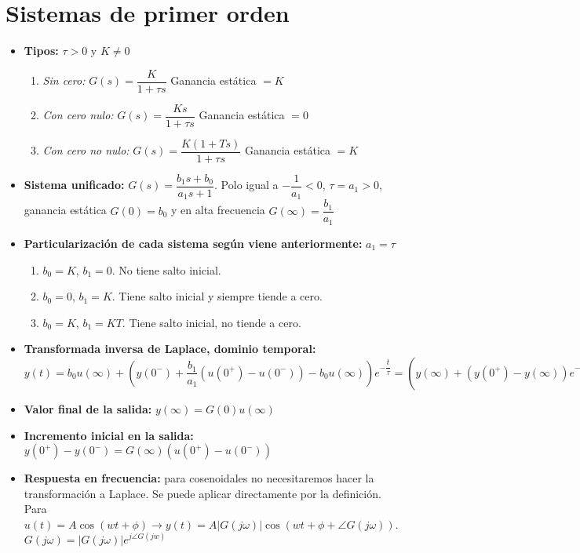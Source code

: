 \documentclass[a4paper, twocolumn, 10pt]{article}
\begin{document}
\section{Sistemas de primer orden}

\begin{itemize}
	\item \textbf{Tipos:} $\tau > 0$ y $K \neq 0$
	\begin{enumerate}
		\item \textit{Sin cero:} $G(s) = \dfrac{K}{1 + \tau s}$ Ganancia estática $= K$
		\item \textit{Con cero nulo:} $G(s) = \dfrac{Ks}{1 + \tau s}$ Ganancia estática $= 0$
		\item \textit{Con cero no nulo:} $G(s) = \dfrac{K(1 + Ts)}{1 + \tau s}$ Ganancia estática $= K$
	\end{enumerate}
	\item \textbf{Sistema unificado:} $G(s) = \dfrac{b_1s + b_0}{a_1s + 1}$. Polo igual a $-\dfrac{1}{a_1} < 0$, $\tau = a_1 > 0$, ganancia estática $G(0) = b_0$ y en alta frecuencia $G(\infty) = \dfrac{b_1}{a_1}$
	\item \textbf{Particularización de cada sistema según viene anteriormente:} $a_1 = \tau$
	\begin{enumerate}
		\item $b_0 = K$, $b_1 = 0$. No tiene salto inicial.
		\item $b_0 = 0$, $b_1 = K$. Tiene salto inicial y siempre tiende a cero.
		\item $b_0 = K$, $b_1 = KT$. Tiene salto inicial, no tiende a cero.
	\end{enumerate}
	\item \textbf{Transformada inversa de Laplace, dominio temporal:} $y(t) = b_0u(\infty) + \left(y(0^-) + \dfrac{b_1}{a_1}\left(u(0^+) - u(0^-)\right) -b_0u(\infty)\right)e^{-\dfrac{t}{\tau}} = \left(y(\infty) + \left(y(0^+) - y(\infty)\right)e^{-\dfrac{t}{\tau}}\right)\gamma(t)$
	\item \textbf{Valor final de la salida:} $y(\infty) = G(0)u(\infty)$
	\item \textbf{Incremento inicial en la salida:} $y(0^+) - y(0^-) = G(\infty)(u(0^+)- u(0^-))$
	\item \textbf{Respuesta en frecuencia:} para cosenoidales no necesitaremos hacer la transformación a Laplace. Se puede aplicar directamente por la definición. Para $u(t) = A\cos(wt + \phi) \rightarrow y(t) = A|G(j\omega)|\cos(wt + \phi + \angle G(j\omega))$. $G(j\omega) = |G(j\omega)|e^{j\angle G(jw)}$
\end{itemize}
\end{document}
